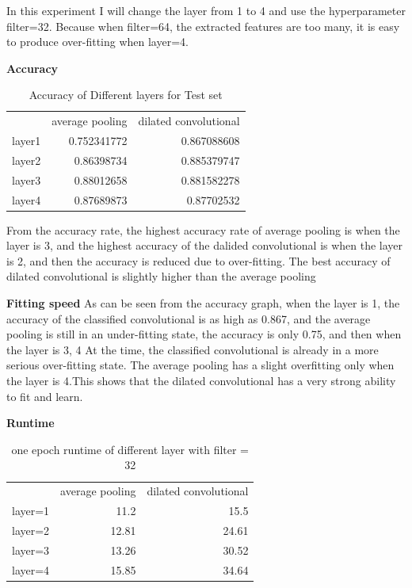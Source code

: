 \documentclass{article}
\begin{document}
In this experiment I will change the layer from 1 to 4 and use the hyperparameter filter=32. Because when filter=64, the extracted features are too many, it is easy to produce over-fitting when layer=4.

\textbf{Accuracy}

\begin{table}[H]
  \centering
  \caption{Accuracy of Different layers for Test set}
    \begin{tabular}{lrr}
          & \multicolumn{1}{l}{average pooling} & \multicolumn{1}{l}{dilated convolutional} \\
    layer1 & 0.752341772 & 0.867088608 \\
    layer2 & 0.86398734 & 0.885379747 \\
    layer3 & 0.88012658 & 0.881582278 \\
    layer4 & 0.87689873 & 0.87702532 \\
    \end{tabular}%
  \label{tab:addlabel}%
\end{table}%

From the accuracy rate, the highest accuracy rate of average pooling is when the layer is 3, and the highest accuracy of the dalided convolutional is when the layer is 2, and then the accuracy is reduced due to over-fitting. The best accuracy of dilated convolutional is slightly higher than the average pooling


\textbf{Fitting speed}
As can be seen from the accuracy graph, when the layer is 1, the accuracy of the classified convolutional is as high as 0.867, and the average pooling is still in an under-fitting state, the accuracy is only 0.75, and then when the layer is 3, 4 At the time, the classified convolutional is already in a more serious over-fitting state. The average pooling has a slight overfitting only when the layer is 4.This shows that the dilated convolutional has a very strong ability to fit and learn.

\textbf{Runtime}

\begin{table}[htbp]
  \centering
  \caption{one epoch runtime of different layer with filter = 32}
    \begin{tabular}{lrr}
          & \multicolumn{1}{l}{average pooling} & \multicolumn{1}{l}{dilated convolutional} \\
    layer=1 & 11.2   & 15.5 \\
    layer=2 & 12.81 & 24.61 \\
    layer=3 & 13.26 & 30.52 \\
    layer=4 & 15.85 & 34.64 \\
    \end{tabular}%
  \label{tab:addlabel}%
\end{table}%
\end{document}
